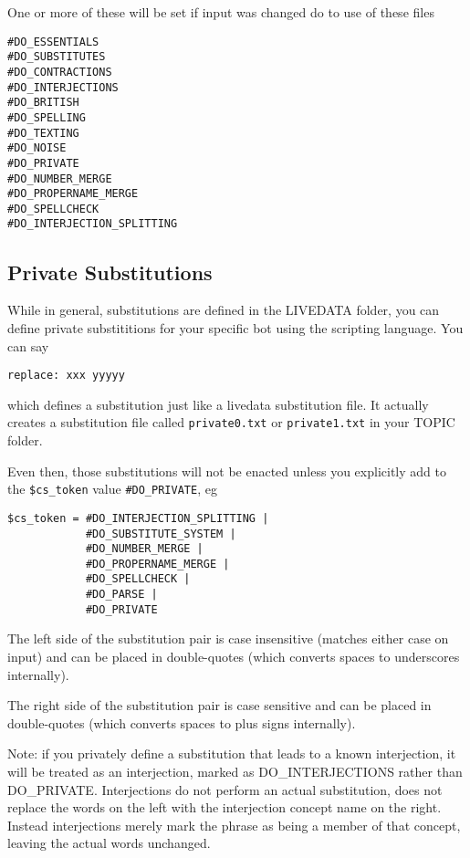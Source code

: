 \documentclass[]{article}
\begin{document}
One or more of these will be set if input was changed do to use of these
files

\begin{verbatim}
#DO_ESSENTIALS           
#DO_SUBSTITUTES         
#DO_CONTRACTIONS            
#DO_INTERJECTIONS       
#DO_BRITISH              
#DO_SPELLING                 
#DO_TEXTING              
#DO_NOISE                   
#DO_PRIVATE                 
#DO_NUMBER_MERGE                
#DO_PROPERNAME_MERGE            
#DO_SPELLCHECK                  
#DO_INTERJECTION_SPLITTING    
\end{verbatim}

\subsection{Private Substitutions}\label{private-substitutions}

While in general, substitutions are defined in the LIVEDATA folder, you
can define private substititions for your specific bot using the
scripting language. You can say

\begin{verbatim}
replace: xxx yyyyy
\end{verbatim}

which defines a substitution just like a livedata substitution file. It
actually creates a substitution file called \texttt{private0.txt} or
\texttt{private1.txt} in your TOPIC folder.

Even then, those substitutions will not be enacted unless you explicitly
add to the \texttt{\$cs\_token} value \texttt{\#DO\_PRIVATE}, eg

\begin{verbatim}
$cs_token = #DO_INTERJECTION_SPLITTING | 
            #DO_SUBSTITUTE_SYSTEM |
            #DO_NUMBER_MERGE | 
            #DO_PROPERNAME_MERGE |
            #DO_SPELLCHECK | 
            #DO_PARSE | 
            #DO_PRIVATE
\end{verbatim}

The left side of the substitution pair is case insensitive (matches
either case on input) and can be placed in double-quotes (which converts
spaces to underscores internally).

The right side of the substitution pair is case sensitive and can be
placed in double-quotes (which converts spaces to plus signs
internally).

Note: if you privately define a substitution that leads to a known
interjection, it will be treated as an interjection, marked as
DO\_INTERJECTIONS rather than DO\_PRIVATE. Interjections do not perform
an actual substitution, does not replace the words on the left with the
interjection concept name on the right. Instead interjections merely
mark the phrase as being a member of that concept, leaving the actual
words unchanged.
\end{document}
